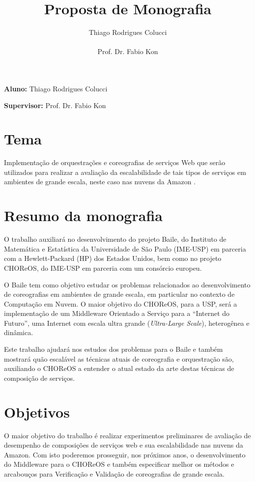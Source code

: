 \documentclass[11pt,a4paper]{article}
\title{Proposta de Monografia}
\author{Thiago Rodrigues Colucci\\\\Prof. Dr. Fabio Kon}
\begin{document}
\maketitle

\newpage

\tableofcontents
\newpage
\textbf{Aluno:} Thiago Rodrigues Colucci

\textbf{Supervisor:} Prof. Dr. Fabio Kon

\section{Tema}
Implementação de orquestrações e coreografias de serviços Web que serão utilizados para realizar a avaliação da escalabilidade de tais tipos de serviços em ambientes de grande escala, neste caso nas nuvens da Amazon \cite{amazonEC2}.

\section{Resumo da monografia}
O trabalho auxiliará no desenvolvimento do projeto Baile, do Instituto de Matemática e Estatística da Universidade de São Paulo (IME-USP) em parceria com a Hewlett-Packard (HP) dos Estados Unidos, bem como no projeto CHOReOS, do IME-USP em parceria com um consórcio europeu. 

O Baile tem como objetivo estudar os problemas relacionados ao desenvolvimento de coreografias em ambientes de grande escala, em particular no contexto de Computação em Nuvem. O maior objetivo do CHOReOS, para a USP, será a implementação de um Middleware Orientado a Serviço para a ``Internet do Futuro'', uma Internet com escala ultra grande (\textit{Ultra-Large Scale}), heterogênea e dinâmica. 

Este trabalho ajudará nos estudos dos problemas para o Baile e também mostrará quão escalável as técnicas atuais de coreografia e orquestração são, auxiliando o CHOReOS a entender o atual estado da arte destas técnicas de composição de serviços.

\section{Objetivos}
O maior objetivo do trabalho é realizar experimentos preliminares de avaliação de desempenho de composições de serviços web e sua escalabilidade nas nuvens da Amazon. Com isto poderemos prosseguir, nos próximos anos, o desenvolvimento do Middleware para o CHOReOS e também especificar melhor os métodos e arcabouços para Verificação e Validação de coreografias de grande escala.
\end{document}
